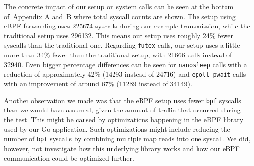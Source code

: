 The concrete impact of our setup on system calls can be seen at the bottom 
of~\hyperref[chap:appendix-fast-relay]{Appendix A} and~\hyperref[chap:appendix-plain-relay]{B} 
where total syscall counts are shown.
The setup using eBPF forwarding uses 225674 syscalls during our example transmission, while the 
traditional setup uses 296132.
This means our setup uses roughly 24\% fewer syscalls than the traditional one.
Regarding \verb|futex| calls, our setup uses a little more than 34\% 
fewer than the traditional setup, with 21666 calls instead of 32940.
Even bigger percentage differences can be seen for \verb|nanosleep| calls with a reduction of 
approximately 42\% (14293 instead of 24716) and \verb|epoll_pwait| calls with 
an improvement of around 67\% (11289 instead of 34149).

Another observation we made was that the eBPF setup uses fewer \verb|bpf| syscalls than we would have assumed,
given the amount of traffic that occurred during the test.
This might be caused by optimizations happening in the eBPF library used by our Go application.
Such optimizations might include reducing the number of \verb|bpf| syscalls 
by combining multiple map reads into one syscall.
We did, however, not investigate how this underlying library works and how our 
eBPF communication could be optimized further.